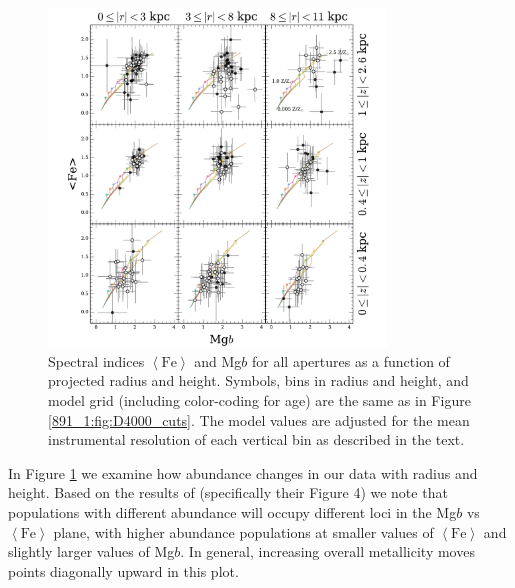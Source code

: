 \begin{figure}
  \centering
  \includegraphics[width=0.8\textwidth]{891_1/figs/Mgb_multires.pdf}
  \caption[Mg$b$ vs $\left<\mathrm{Fe}\right>$ in radius and height
  bins]{\label{891_1:fig:Mgb_cuts}\fixspacing Spectral indices
    $\left<\mathrm{Fe}\right>$ and Mg$b$ for all apertures as a
    function of projected radius and height. Symbols, bins in radius
    and height, and model grid (including color-coding for age) are
    the same as in Figure \ref{891_1:fig:D4000_cuts}. The model values are
    adjusted for the mean instrumental resolution of each vertical bin
    as described in the text.}
\end{figure}

In Figure \ref{891_1:fig:Mgb_cuts} we examine how abundance changes in our
data with radius and height. Based on the results of \citet{Thomas03}
(specifically their Figure 4) we note that populations with different
abundance will occupy different loci in the Mg$b$ vs
$\left<\mathrm{Fe}\right>$ plane, with higher abundance populations at
smaller values of $\left<\mathrm{Fe}\right>$ and slightly larger
values of Mg$b$. In general, increasing overall metallicity moves
points diagonally upward in this plot.

